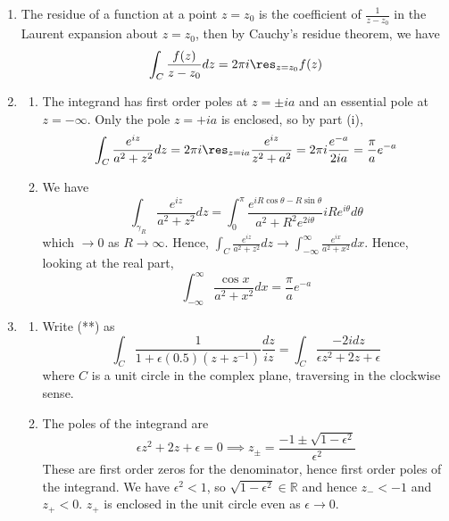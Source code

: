 \documentclass[a4paper]{article}
\begin{document}
\begin{ans}\leavevmode
\begin{enumerate}[label=(\roman*)]
\item The residue of a function at a point $z=z_0$ is the coefficient of $\frac{1}{z-z_0}$ in the Laurent expansion about $z=z_0$, then by Cauchy's residue theorem, we have
$$\int_C\frac{f(z)}{z-z_0}dz=2\pi i\res_{z=z_0}f(z)$$
\item 
\begin{enumerate}[label=(\alph*)]
\item The integrand has first order poles at $z=\pm ia$ and an essential pole at $z=-\infty$. Only the pole $z=+ia$ is enclosed, so by part (i), 
$$\int_C\frac{e^{iz}}{a^2+z^2}dz=2\pi i\res_{z=ia}\frac{e^{iz}}{z^2+a^2}=2\pi i\frac{e^{-a}}{2ia}=\frac{\pi}{a}e^{-a}$$
\begin{center}
  \end{center}
\item 
  We have 
  $$\int_{\gamma_R}\frac{e^{iz}}{a^2+z^2}dz=\int_0^\pi\frac{e^{iR\cos\theta-R\sin\theta}}{a^2+R^2e^{2i\theta}}iRe^{i\theta}d\theta$$
  which $\rightarrow 0$ as $R\rightarrow\infty$. Hence, $\int_C\frac{e^{iz}}{a^2+z^2}dz\rightarrow\int_{-\infty}^\infty\frac{e^{ix}}{a^2+x^2}dx$. Hence, looking at the real part,
  $$\int_{-\infty}^\infty\frac{\cos x}{a^2+x^2}dx=\frac{\pi}{a}e^{-a}$$
\end{enumerate}
\item
\begin{enumerate}[label=(\alph*)]
\item Write (**) as
$$\int_C\frac{1}{1+\epsilon(0.5)(z+z^{-1})}\frac{dz}{iz}=\int_C\frac{-2idz}{\epsilon z^2+2z+\epsilon}$$
where $C$ is a unit circle in the complex plane, traversing in the clockwise sense. 
\item 
The poles of the integrand are
$$\epsilon z^2+2z+\epsilon=0\implies z_{\pm}=\frac{-1\pm\sqrt{1-\epsilon^2}}{\epsilon^2}$$
These are first order zeros for the denominator, hence first order poles of the integrand. We have $\epsilon^2<1$, so $\sqrt{1-\epsilon^2}\in\mathbb{R}$ and hence
$z_-<-1$ and $z_+<0$. $z_+$ is enclosed in the unit circle even as $\epsilon\rightarrow 0$.
 \begin{center}
\end{center}
\end{enumerate}
\end{enumerate}
\end{ans}
\end{document}
